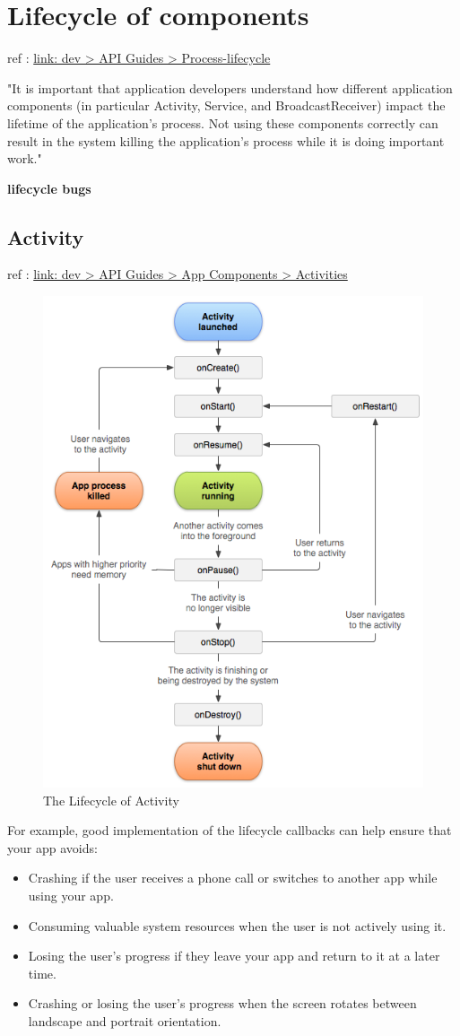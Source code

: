 \section{Lifecycle of components}
\label{sec:orgheadline9}

ref : \href{https://developer.android.com/guide/topics/processes/process-lifecycle.html}{link: dev > API Guides > Process-lifecycle}

"It is important that application developers understand how different
application components (in particular Activity, Service, and
BroadcastReceiver) impact the lifetime of the application's process. Not using
these components correctly can result in the system killing the application's
process while it is doing important work."

\textbf{lifecycle bugs}



\subsection{Activity}

ref : \href{https://developer.android.com/guide/components/activities/activity-lifecycle.html}{link: dev > API Guides > App Components > Activities}

\begin{figure}
  \includegraphics[width=.5\textwidth]{img/activity_lifecycle}
  \caption{The Lifecycle of Activity}
\end{figure}

For example, good implementation of the lifecycle callbacks can help ensure
that your app avoids:
\begin{itemize}
\item Crashing if the user receives a phone call or switches to another app
  while using your app.
\item Consuming valuable system resources when the user is not actively using
  it.
\item Losing the user's progress if they leave your app and return to it at a
  later time.
\item Crashing or losing the user's progress when the screen rotates between
  landscape and portrait orientation.
\end{itemize}


